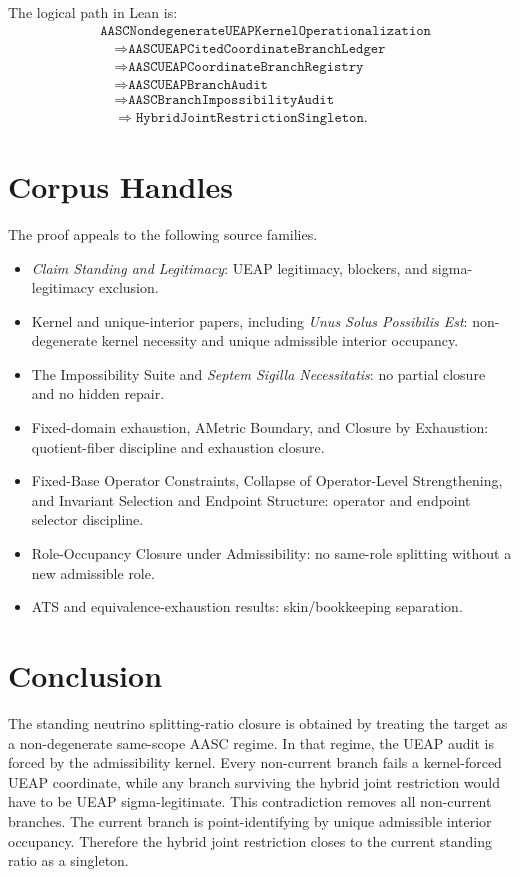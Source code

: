 \documentclass[11pt]{article}
\theoremstyle{definition}
\begin{document}
The logical path in Lean is:
\[
\begin{aligned}
&\texttt{AASCNondegenerateUEAPKernelOperationalization}\\
&\quad\Longrightarrow
\texttt{AASCUEAPCitedCoordinateBranchLedger}\\
&\quad\Longrightarrow
\texttt{AASCUEAPCoordinateBranchRegistry}\\
&\quad\Longrightarrow
\texttt{AASCUEAPBranchAudit}\\
&\quad\Longrightarrow
\texttt{AASCBranchImpossibilityAudit}\\
&\quad\Longrightarrow
\texttt{HybridJointRestrictionSingleton}.
\end{aligned}
\]

\section{Corpus Handles}

The proof appeals to the following source families.

\begin{itemize}[leftmargin=2em]
\item \emph{Claim Standing and Legitimacy}: UEAP legitimacy, blockers, and
sigma-legitimacy exclusion.
\item Kernel and unique-interior papers, including \emph{Unus Solus
Possibilis Est}: non-degenerate kernel necessity and unique admissible
interior occupancy.
\item The Impossibility Suite and \emph{Septem Sigilla Necessitatis}: no
partial closure and no hidden repair.
\item Fixed-domain exhaustion, AMetric Boundary, and Closure by Exhaustion:
quotient-fiber discipline and exhaustion closure.
\item Fixed-Base Operator Constraints, Collapse of Operator-Level
Strengthening, and Invariant Selection and Endpoint Structure: operator and
endpoint selector discipline.
\item Role-Occupancy Closure under Admissibility: no same-role splitting
without a new admissible role.
\item ATS and equivalence-exhaustion results: skin/bookkeeping separation.
\end{itemize}

\section{Conclusion}

The standing neutrino splitting-ratio closure is obtained by treating the
target as a non-degenerate same-scope AASC regime. In that regime, the UEAP
audit is forced by the admissibility kernel. Every non-current branch fails a
kernel-forced UEAP coordinate, while any branch surviving the hybrid joint
restriction would have to be UEAP sigma-legitimate. This contradiction removes
all non-current branches. The current branch is point-identifying by unique
admissible interior occupancy. Therefore the hybrid joint restriction closes
to the current standing ratio as a singleton.
\end{document}
